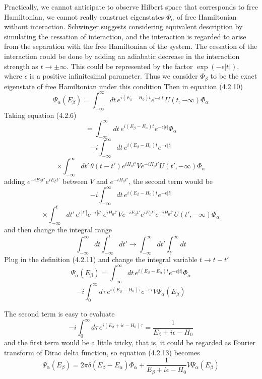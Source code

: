 \documentclass[12pt]{article}
\numberwithin{equation}{subsection}
\begin{document}
Practically, we cannot anticipate to observe Hilbert space that corresponds to free Hamiltonian, we cannot really construct eigenstates $\Phi_{\alpha}$ of free Hamiltonian without interaction.
Schwinger suggests considering equivalent description by simulating the cessation of interaction, and the interaction is regarded to arise from the separation with the free Hamiltonian of the system.
The cessation of the interaction could be done by adding an adiabatic decrease in the interaction strength as $t\rightarrow\pm\infty$.
This could be represented by the factor $\exp(-\epsilon\left|t\right|)$, where $\epsilon$ is a positive infinitesimal parameter.
Thus we consider $\Phi_{\beta}$ to be the exact eigenstate of free Hamiltonian under this condition
Then in equation (4.2.10)
\begin{equation}
    \Psi_{\alpha}(E_{\beta}) = \int_{-\infty}^{\infty}{dt\,e^{i(E_{\beta}-H_0)t}e^{-\epsilon\left|t\right|}U(t,-\infty)\Phi_{\alpha}}
\end{equation}
Taking equation (4.2.6)
\[=\int_{-\infty}^{\infty}{dt\,e^{i(E_{\beta}-E_{\alpha})t}e^{-\epsilon|t|}\Phi_{\alpha}}\]
\[ -i \int_{-\infty}^{\infty}{dt\,e^{i(E_{\beta}-H_0)t}e^{-\epsilon|t|}}\]
\[\times\int_{-\infty}^{\infty}{dt'\,\theta(t-t')e^{iH_0t'}Ve^{-iH_0t'}U(t',-\infty)\Phi_{\alpha}}\]
adding $e^{-iE_{\beta}t'}e^{iE_{\beta}t'}$ between $V$ and $e^{-iH_0t'}$, the second term would be
\[-i\int_{-\infty}^{\infty}{dt\,e^{i(E_{\beta}-H_0)t}e^{-\epsilon|t|}}\]
\[\times\int_{-\infty}^{t}{dt'\,e^{\epsilon |t'|}e^{-\epsilon|t'|}e^{iH_0t'}Ve^{-iE_{\beta}t'}e^{iE_{\beta}t'}e^{-iH_0t'}U(t', -\infty)\Phi_{\alpha}}\]
and then change the integral range
\begin{equation}
    \int_{-\infty}^{\infty}{dt}\int_{-\infty}^{t}{dt'}\rightarrow\int_{-\infty}^{\infty}{dt'}\int_{t'}^{\infty}{dt}
\end{equation}
Plug in the definition (4.2.11) and change the integral variable $t\rightarrow t-t'$
\[\Psi_{\alpha}(E_{\beta}) = \int_{-\infty}^{\infty}{dt\,e^{i(E_{\beta}-E_{\alpha})t}e^{-\epsilon|t|}\Phi_{\alpha}}\]
\begin{equation}
    -i\int^{\infty}_{0}{d\tau\,e^{i(E_{\beta}-H_0)\tau}e^{-\epsilon\tau}V\Psi_{\alpha}(E_{\beta})}
\end{equation}

The second term is easy to evaluate
\begin{equation}
    -i\int_{0}^{\infty}{d\tau\,e^{i(E_{\beta}+i\epsilon-H_0)\tau}} = \frac{1}{E_{\beta}+i\epsilon-H_0}
\end{equation}
and the first term would be a little tricky, that is, it could be regarded as Fourier transform of Dirac delta function, so equation (4.2.13) becomes
\begin{equation}
    \Psi_{\alpha}(E_{\beta}) = 2\pi\delta(E_{\beta}-E_{\alpha})\Phi_{\alpha}+\frac{1}{E_{\beta}+i\epsilon-H_0}V\Psi_{\alpha}(E_{\beta})
\end{equation}
\end{document}
